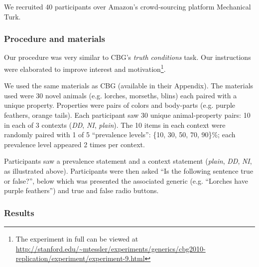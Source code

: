 \documentclass[10pt,letterpaper]{article}
\begin{document}
We recruited 40 participants over Amazon's crowd-sourcing platform Mechanical Turk.  

\subsubsection{Procedure and materials}

Our procedure was very similar to CBG's \emph{truth conditions} task. Our instructions were elaborated to improve interest and motivation\footnote{The experiment in full can be viewed at \url{http://stanford.edu/~mtessler/experiments/generics/cbg2010-replication/experiment/experiment-9.html}}. 

We used the same materials as CBG (available in their Appendix). The materials used were 30 novel animals (e.g. lorches, morseths, blins) each paired with a unique property. Properties were pairs of colors and body-parts (e.g. purple feathers, orange tails). Each participant saw 30 unique animal-property pairs: 10 in each of 3 contexts (\emph{DD}, \emph{NI}, \emph{plain}). The 10 items in each context were randomly paired with 1 of 5 ``prevalence levels'': \{10, 30, 50, 70, 90\}\%; each prevalence level appeared 2 times per context. 

Participants saw a prevalence statement and a context statement (\emph{plain}, \emph{DD}, \emph{NI}, as illustrated above). 
Participants were then asked ``Is the following sentence true or false?'', below which was presented the associated generic (e.g. ``Lorches have purple feathers'') and true and false radio buttons. 

\subsubsection{Results}
\end{document}
